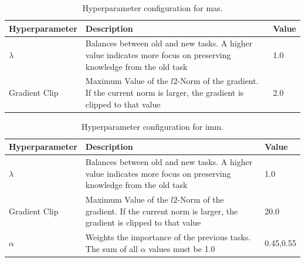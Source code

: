 \begin{table}[!htb]
    \begin{tabularx}{\textwidth}{| l | X | l |} 
        \hline
        Hyperparameter & Description & Value \\ 
        \hline 
        $\lambda$ & Balances between old and new tasks. A higher value indicates more focus
        on preserving knowledge \newline from the old task & 1.0  \\ 
        \hline
        Gradient Clip & Maximum Value of the $l2$-Norm of the gradient. If the current norm is larger, the
        gradient is clipped to that value & 2.0 \\ 
        \hline
    \end{tabularx}
    \caption{Hyperparameter configuration for \gls{mas}.}
    \label{fig:MASparams}
\end{table}

\begin{table}[!htb]
    \begin{tabularx}{\textwidth}{| l | X | l |} 
        \hline
        Hyperparameter & Description & Value \\ 
        \hline 
        $\lambda$ & Balances between old and new tasks. A higher value indicates more focus
        on preserving knowledge from the old task & 1.0  \\ 
        \hline
        Gradient Clip & Maximum Value of the $l2$-Norm of the gradient. If the current norm is larger, the
        gradient is clipped to that value & 20.0 \\ 
        \hline
        $\alpha$ & Weights the importance of the previous tasks. The sum of all $\alpha$ values must be 1.0 & 0.45,0.55 \\
        \hline
    \end{tabularx}
    \caption{Hyperparameter configuration for \gls{imm}.}
    \label{fig:IMMparams}
\end{table}

